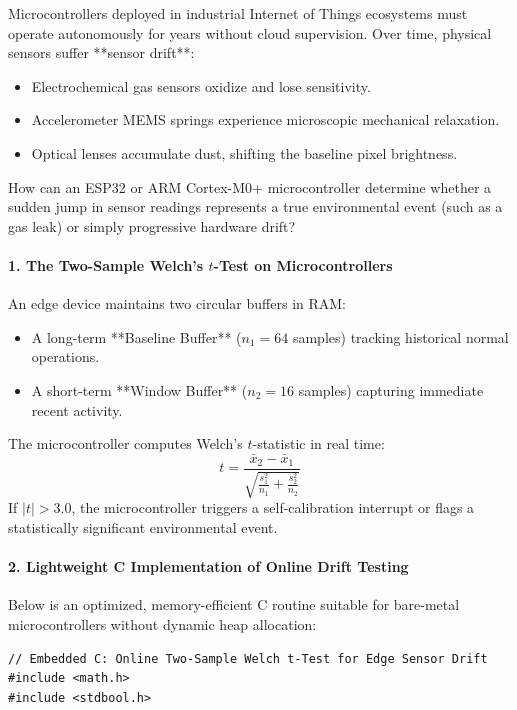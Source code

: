\begin{iotbox}
Microcontrollers deployed in industrial Internet of Things ecosystems must operate autonomously for years without cloud supervision. Over time, physical sensors suffer **sensor drift**:
\begin{itemize}
    \item Electrochemical gas sensors oxidize and lose sensitivity.
    \item Accelerometer MEMS springs experience microscopic mechanical relaxation.
    \item Optical lenses accumulate dust, shifting the baseline pixel brightness.
\end{itemize}

How can an ESP32 or ARM Cortex-M0+ microcontroller determine whether a sudden jump in sensor readings represents a true environmental event (such as a gas leak) or simply progressive hardware drift?

\paragraph{1. The Two-Sample Welch's $t$-Test on Microcontrollers}
An edge device maintains two circular buffers in RAM:
\begin{itemize}
    \item A long-term **Baseline Buffer** ($n_1 = 64$ samples) tracking historical normal operations.
    \item A short-term **Window Buffer** ($n_2 = 16$ samples) capturing immediate recent activity.
\end{itemize}
The microcontroller computes Welch's $t$-statistic in real time:
\begin{equation}
t = \frac{\bar{x}_2 - \bar{x}_1}{\sqrt{\frac{s_1^2}{n_1} + \frac{s_2^2}{n_2}}}\label{eq:welch_embedded}
\end{equation}
If $|t| > 3.0$, the microcontroller triggers a self-calibration interrupt or flags a statistically significant environmental event.

\paragraph{2. Lightweight C Implementation of Online Drift Testing}
Below is an optimized, memory-efficient C routine suitable for bare-metal microcontrollers without dynamic heap allocation:

\begin{lstlisting}[style=pythonstyle]
// Embedded C: Online Two-Sample Welch t-Test for Edge Sensor Drift
#include <math.h>
#include <stdbool.h>


\end{lstlisting}
\end{iotbox}
